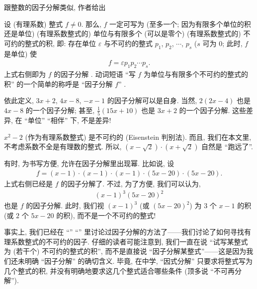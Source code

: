 跟整数的因子分解类似, 作者给出
\begin{definition}
    设 (有理系数) 整式 $f \neq 0$. 那么, $f$ 一定可写为 (至多一个; 因为有限多个单位的积还是单位) (有理系数整式的) 单位与有限多个 (可以是零个) (有理系数整式的) 不可约的整式的积, 即: 存在单位 $\varepsilon$ 与不可约的整式 $p_1$, $p_2$, $\cdots$, $p_s$ ($s$ 可为 $0$; 此时, $f$ 是单位) 使
    \begin{align*}
        f = \varepsilon p_1 p_2 \cdots p_s.
    \end{align*}
    上式右侧即为 $f$ 的因子分解 . 动词短语 ``写 $f$ 为单位与有限多个不可约的整式的积'' 的一个简单的称呼是 ``因子分解 $f$'' .
\end{definition}

\begin{remark}
    依此定义, $3x + 2$, $4x - 8$, $-x - 1$ 的因子分解可以是自身. 当然, $2(2x - 4)$ 也是 $4x - 8$ 的一个因子分解; 甚至, $\frac{1}{5} (15x + 10)$ 也是 $3x + 2$ 的一个因子分解. 这些差异, 在 ``单位'' ``相伴'' 下, 不是差异!

    $x^2 - 2$ (作为有理系数整式) 是不可约的 (Eisenstein 判别法). 而且, 我们在本文里, 不考虑系数不全是有理数的整式. 所以, $(x - \sqrt{2}) \cdot (x + \sqrt{2})$ 自然是 ``跑远了''.
\end{remark}

\begin{remark}
    有时, 为书写方便, 允许在因子分解里出现幂. 比如说, 设
    \begin{align*}
        f = (x-1) \cdot (x-1) \cdot (x-1) \cdot (5x-20) \cdot (5x-20).
    \end{align*}
    上式右侧已经是 $f$ 的因子分解了. 不过, 为了方便, 我们可以认为,
    \begin{align*}
        (x-1)^3 (5x-20)^2
    \end{align*}
    也是 $f$ 的因子分解. 此时, 我们视 $(x-1)^3$ (或 $(5x-20)^2$) 为 $3$ 个 $x-1$ 的积 (或 $2$ 个 $5x-20$ 的积), 而不是一个不可约的整式!
\end{remark}

事实上, 我们已经在 ``\RationalRootsOfPolynomialsOverQ '' ``\FactorsOfHigherDegreeOfPolynomialsOverQ '' 里讨论过因子分解的方法了——我们讨论了如何寻找有理系数整式的不可约的因子. 仔细的读者可能注意到, 我们一直在说 ``试写某整式为 (若干个) 不可约的整式的积'', 而不是直接说 ``因子分解某整式''——这是因为我们还未明确 ``因子分解'' 的确切含义. 毕竟, 在中学, ``因式分解'' 只要求将整式写为几个整式的积, 并没有明确地要求这几个整式适合哪些条件 (顶多说 ``不可再分解'').

